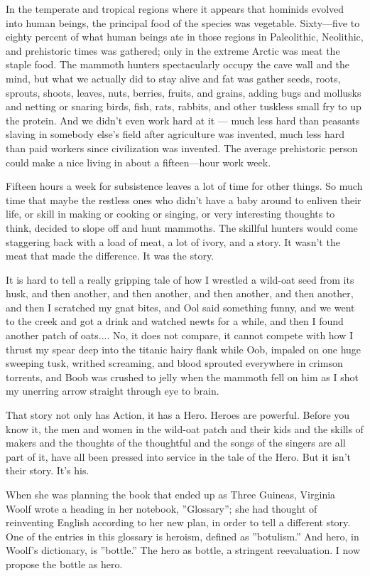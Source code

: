 
In the temperate and tropical regions where it
appears that hominids evolved into human
beings, the principal food of the species was
vegetable. Sixty---five to eighty percent of what
human beings ate in those regions in Paleolithic,
Neolithic, and prehistoric times was gathered;
only in the extreme Arctic was meat the staple
food. The mammoth hunters spectacularly
occupy the cave wall and the mind, but what we
actually did to stay alive and fat was gather seeds,
roots, sprouts, shoots, leaves, nuts, berries, fruits,
and grains, adding bugs and mollusks and netting
or snaring birds, fish, rats, rabbits, and other
tuskless small fry to up the protein. And we didn’t
even work hard at it --- much less hard than
peasants slaving in somebody else’s field after
agriculture was invented, much less hard than
paid workers since civilization was invented.
The average prehistoric person could make a
nice living in about a fifteen---hour work week.

Fifteen hours a week for subsistence leaves a
lot of time for other things. So much time that
maybe the restless ones who didn’t have a baby
around to enliven their life, or skill in making or
cooking or singing, or very interesting thoughts
to think, decided to slope off and hunt
mammoths. The skillful hunters would come
staggering back with a load of meat, a lot of ivory,
and a story. It wasn’t the meat that made the
difference. It was the story.

It is hard to tell a really gripping tale of how I
wrestled a wild-oat seed from its husk, and then
another, and then another, and then another, and
then another, and then I scratched my gnat bites,
and Ool said something funny, and we went to
the creek and got a drink and watched newts for
a while, and then I found another patch of oats....
No, it does not compare, it cannot compete with
how I thrust my spear deep into the titanic hairy
flank while Oob, impaled on one huge sweeping
tusk, writhed screaming, and blood sprouted
everywhere in crimson torrents, and Boob was
crushed to jelly when the mammoth fell on him
as I shot my unerring arrow straight through eye
to brain.

That story not only has Action, it has a Hero.
Heroes are powerful. Before you know it, the
men and women in the wild-oat patch and their
kids and the skills of makers and the thoughts of
the thoughtful and the songs of the singers are all
part of it, have all been pressed into service in the
tale of the Hero. But it isn’t their story. It’s his.

When she was planning the book that ended
up as Three Guineas, Virginia Woolf wrote a
heading in her notebook, ''Glossary''; she had
thought of reinventing English according to her
new plan, in order to tell a different story. One of
the entries in this glossary is heroism, defined as
''botulism.'' And hero, in Woolf’s dictionary, is
''bottle.'' The hero as bottle, a stringent
reevaluation. I now propose the bottle as hero.

